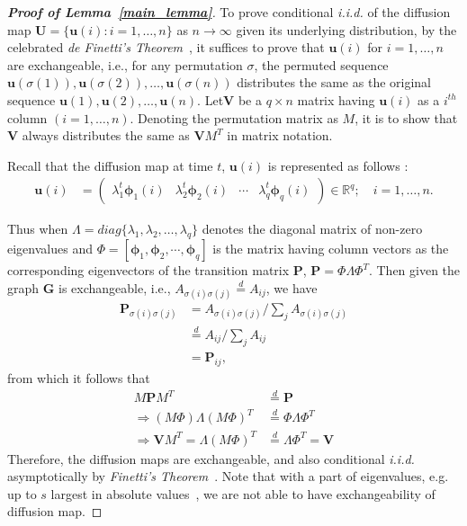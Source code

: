 \documentclass[11pt]{article}
\theoremstyle{definition}
\begin{document}
	\begin{proof}[\textbf{Proof of Lemma~\ref{main_lemma}}]
		To prove conditional \textit{i.i.d.} of the diffusion map $\mathbf{U} = \{\mathbf{u}(i) : i=1,\ldots,n\}$ as $n \rightarrow \infty$ given its underlying distribution, by the celebrated \textit{de Finetti's Theorem}~\cite{diaconis1980finite}, it suffices to prove that $\mathbf{u}(i)$ for $i=1,\ldots,n$ are exchangeable, i.e., for any permutation $\sigma$, the permuted sequence $\mathbf{u}(\sigma(1)), \mathbf{u}(\sigma(2)), \ldots,\mathbf{u}(\sigma(n))$ distributes the same as the original sequence $\mathbf{u}(1), \mathbf{u}(2), \ldots,\mathbf{u}(n)$. Let$\mathbf{V}$ be a $q \times n$ matrix having $\mathbf{u}(i)$ as a $i^{th}$ column $(i = 1, \ldots, n)$. Denoting the permutation matrix as $M$, it is to show that $\mathbf{V}$ always distributes the same as $\mathbf{V} M^{T}$ in matrix notation. 
		
		Recall that the diffusion map at time $t$, $\mathbf{u}(i)$ is represented as follows :
		\begin{align}
		\mathbf{u}(i)  &= \begin{pmatrix} \lambda^{t}_{1} \mathbf{\phi}_{1}(i) & \lambda^{t}_{2} \mathbf{\phi}_{2} (i)  & \cdots & \lambda^{t}_{q} \mathbf{\phi}_{q}(i) \end{pmatrix} \in \mathbb{R}^{q}; \quad i = 1, \ldots, n.
		\end{align}
		
		Thus when $\Lambda=diag\{ \lambda_{1},\lambda_2,\ldots,\lambda_q \}$ denotes the diagonal matrix of non-zero eigenvalues and $\Phi =[ \mathbf{\phi}_1, \mathbf{\phi}_2,\cdots, \mathbf{\phi}_q ]$ is the matrix having column vectors as the corresponding eigenvectors of the transition matrix $\mathbf{P}$, $\mathbf{P}=\Phi \Lambda \Phi^{T}$. Then given the graph $\mathbf{G}$ is exchangeable, i.e., $A_{\sigma(i)\sigma(j)} \stackrel{d}{=} A_{ij}$, we have
		\begin{align*}
		\mathbf{P}_{\sigma(i) \sigma(j)} &= A_{\sigma(i) \sigma(j)} / \sum\limits_{j} A_{\sigma(i)\sigma(j)} \\
		&\stackrel{d}{=} A_{ij} /  \sum\limits_{j} A_{ij} \\
		&= \mathbf{P}_{ij},
		\end{align*}
		from which it follows that
		\begin{align*}
		M \mathbf{P} M^{T} &\stackrel{d}{=} \mathbf{P} \\
		\Rightarrow (M \Phi) \Lambda (M \Phi)^{T} &\stackrel{d}{=} \Phi \Lambda \Phi^{T} \\
		\Rightarrow \mathbf{V} M^{T}= \Lambda (M \Phi)^{T} &\stackrel{d}{=} \Lambda \Phi^{T} = \mathbf{V}
		\end{align*}	
		Therefore, the diffusion maps are exchangeable, and also conditional \textit{i.i.d.} asymptotically by \textit{Finetti’s Theorem}~\cite{diaconis1980finite,orbanz2015bayesian}. Note that with a part of eigenvalues, e.g. up to $s$ largest in absolute values~\cite{coifman2006diffusion}, we are not able to have exchangeability of diffusion map.
	\end{proof}
	
\end{document}
